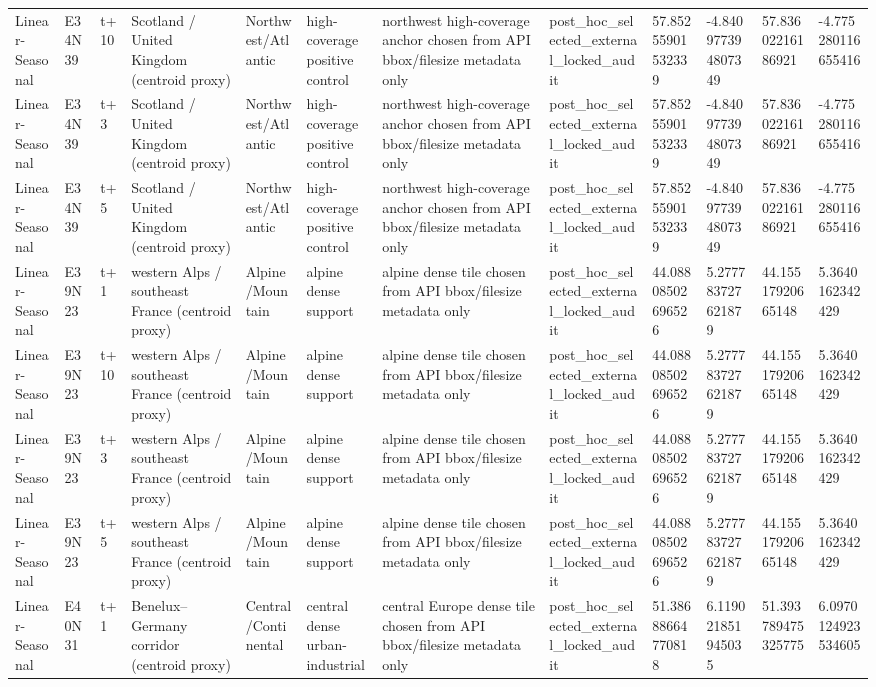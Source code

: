 \begin{landscape}
\begin{longtable}{llllllllllll}
Linear-Seasonal & E34N39 & t+10 & Scotland / United Kingdom (centroid proxy) & Northwest/Atlantic & high-coverage positive control & northwest high-coverage anchor chosen from API bbox/filesize metadata only & post\_hoc\_selected\_external\_locked\_audit & 57.85255901532339 & -4.840977394807349 & 57.83602216186921 & -4.775280116655416 \\
Linear-Seasonal & E34N39 & t+3 & Scotland / United Kingdom (centroid proxy) & Northwest/Atlantic & high-coverage positive control & northwest high-coverage anchor chosen from API bbox/filesize metadata only & post\_hoc\_selected\_external\_locked\_audit & 57.85255901532339 & -4.840977394807349 & 57.83602216186921 & -4.775280116655416 \\
Linear-Seasonal & E34N39 & t+5 & Scotland / United Kingdom (centroid proxy) & Northwest/Atlantic & high-coverage positive control & northwest high-coverage anchor chosen from API bbox/filesize metadata only & post\_hoc\_selected\_external\_locked\_audit & 57.85255901532339 & -4.840977394807349 & 57.83602216186921 & -4.775280116655416 \\
Linear-Seasonal & E39N23 & t+1 & western Alps / southeast France (centroid proxy) & Alpine/Mountain & alpine dense support & alpine dense tile chosen from API bbox/filesize metadata only & post\_hoc\_selected\_external\_locked\_audit & 44.08808502696526 & 5.277783727621879 & 44.15517920665148 & 5.3640162342429 \\
Linear-Seasonal & E39N23 & t+10 & western Alps / southeast France (centroid proxy) & Alpine/Mountain & alpine dense support & alpine dense tile chosen from API bbox/filesize metadata only & post\_hoc\_selected\_external\_locked\_audit & 44.08808502696526 & 5.277783727621879 & 44.15517920665148 & 5.3640162342429 \\
Linear-Seasonal & E39N23 & t+3 & western Alps / southeast France (centroid proxy) & Alpine/Mountain & alpine dense support & alpine dense tile chosen from API bbox/filesize metadata only & post\_hoc\_selected\_external\_locked\_audit & 44.08808502696526 & 5.277783727621879 & 44.15517920665148 & 5.3640162342429 \\
Linear-Seasonal & E39N23 & t+5 & western Alps / southeast France (centroid proxy) & Alpine/Mountain & alpine dense support & alpine dense tile chosen from API bbox/filesize metadata only & post\_hoc\_selected\_external\_locked\_audit & 44.08808502696526 & 5.277783727621879 & 44.15517920665148 & 5.3640162342429 \\
Linear-Seasonal & E40N31 & t+1 & Benelux–Germany corridor (centroid proxy) & Central/Continental & central dense urban-industrial & central Europe dense tile chosen from API bbox/filesize metadata only & post\_hoc\_selected\_external\_locked\_audit & 51.38688664770818 & 6.119021851945035 & 51.393789475325775 & 6.0970124923534605 \\

\end{longtable}
\end{landscape}
